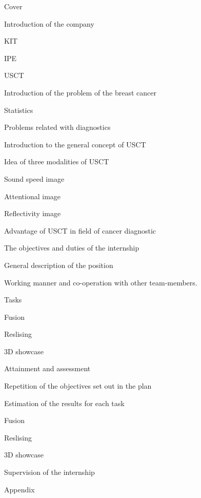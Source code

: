 \documentclass[english]{article}
\date{}
\begin{document}
\begin{legal}
\item Cover
\item Introduction of the company
\begin{legal}
\item KIT
\item IPE
\item USCT
\begin{legal}
\item Introduction of the problem of the breast cancer
 \begin{legal}
\item Statistics
\item Problems related with diagnostics
\end{legal}
\item Introduction to the general concept of USCT
\item Idea of three modalities of USCT
 \begin{legal}
\item Sound speed image
\item Attentional image
\item Reflectivity image
\end{legal}
\item Advantage of USCT in field of cancer diagnostic
\end{legal}
\end{legal}
\item The objectives and duties of the internship
 \begin{legal}
\item General description of the position
\item Working manner and co-operation with other team-members.
\item Tasks
 \begin{legal}
\item Fusion
\item Reslising
\item 3D showcase
\end{legal}
\end{legal}
\item Attainment and assessment 
\begin{legal}
\item Repetition of the objectives set out in the plan
\item Estimation of the results for each task
 \begin{legal}
\item Fusion
\item Reslising
\item 3D showcase
\end{legal}
\end{legal}

\item Supervision of the internship
\item Appendix
\end{legal}
\end{document}
